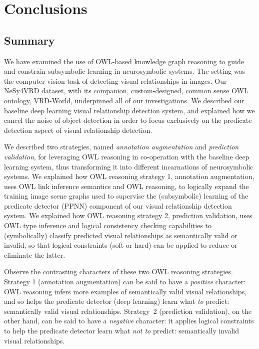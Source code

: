 \documentclass[]{jair}
\begin{document}



\section{Conclusions}
\label{sec:summary}

\subsection{Summary}
We have examined the use of OWL-based knowledge graph reasoning to guide and constrain subsymbolic learning in neurosymbolic systems.
The setting was the computer vision task of detecting visual relationships in images.
Our NeSy4VRD dataset, with its companion, custom-designed, common sense OWL ontology, VRD-World, underpinned all of our investigations.
We described our baseline deep learning visual relationship detection system, and explained how we cancel the noise of object detection in order to focus exclusively on the predicate detection aspect of visual relationship detection.

We described two strategies, named \emph{annotation augmentation} and \emph{prediction validation}, for leveraging OWL reasoning in co-operation with the baseline deep learning system, thus transforming it into different incarnations of neurosymbolic systems. 
We explained how OWL reasoning strategy 1, annotation augmentation, uses OWL link inference semantics and OWL reasoning, to logically expand the training image scene graphs used to supervise the (subsymbolic) learning of the predicate detector (PPNN) component of our visual relationship detection system.
We explained how OWL reasoning strategy 2, prediction validation, uses OWL type inference and logical consistency checking capabilities to (symbolically) classify predicted visual relationships as semantically valid or invalid, so that logical constraints (soft or hard) can be applied to reduce or eliminate the latter.

Observe the contrasting characters of these two OWL reasoning strategies.
Strategy 1 (annotation augmentation) can be said to have a \emph{positive} character: OWL reasoning infers more examples of semantically valid visual relationships, and so helps the predicate detector (deep learning) learn what \emph{to} predict: semantically valid visual relationships.
Strategy~2 (prediction validation), on the other hand, can be said to have a \emph{negative} character: it applies logical constraints to help the predicate detector learn what \emph{not to} predict: semantically invalid visual relationships.
\end{document}
